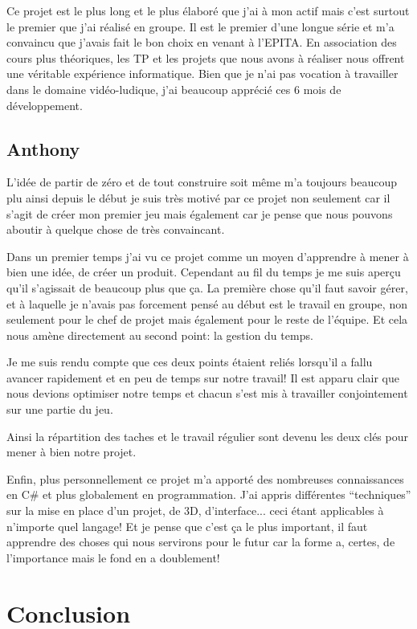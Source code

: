 \documentclass[11pt]{report}
\begin{document}
Ce projet est le plus long et le plus élaboré que j’ai à mon actif mais c’est surtout le premier que j’ai réalisé en groupe. Il est le premier d’une longue série et m’a convaincu que j’avais fait le bon choix en venant à l’EPITA. En association des cours plus théoriques, les TP et les projets que nous avons à réaliser nous offrent une véritable expérience informatique. Bien que je n’ai pas vocation à travailler dans le domaine vidéo-ludique, j’ai beaucoup apprécié ces 6 mois de développement.

\section{Anthony}

L'idée de partir de zéro et de tout construire soit même m'a toujours beaucoup plu ainsi depuis le début je suis très motivé par ce projet non seulement car il s'agit de créer mon premier jeu mais également car je pense que nous pouvons aboutir à quelque chose de très convaincant.

Dans un premier temps j'ai vu ce projet comme un moyen d'apprendre à mener à bien une idée, de créer un produit. Cependant au fil du temps je me suis aperçu qu'il s'agissait de beaucoup plus que ça. La première chose qu'il faut savoir gérer, et à laquelle je n'avais pas forcement pensé au début est le travail en groupe, non seulement pour le chef de projet mais également pour le reste de l'équipe. Et cela nous amène directement au second point: la gestion du temps.

Je me suis rendu compte que ces deux points étaient reliés lorsqu'il a fallu avancer rapidement et en peu de temps sur notre travail! Il est apparu clair que nous devions optimiser notre temps et chacun s'est mis à travailler conjointement sur une partie du jeu.

Ainsi la répartition des taches et le travail régulier sont devenu les deux clés pour mener à bien notre projet.

Enfin, plus personnellement ce projet m'a apporté des nombreuses connaissances en C\# et plus globalement en programmation. J'ai appris différentes ``techniques''  sur la mise en place d'un projet, de 3D, d'interface... ceci étant applicables à n'importe quel langage! Et je pense que c'est ça le plus important, il faut apprendre des choses qui nous servirons pour le futur car la forme a, certes, de l'importance mais le fond en a doublement!

\chapter*{Conclusion}
\end{document}
